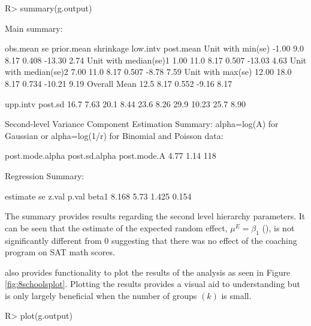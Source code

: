 \documentclass[article]{jss}
\begin{document}
\begin{CodeChunk}
\begin{CodeInput}
R> summary(g.output)
\end{CodeInput}
\begin{CodeOutput}
Main summary:

                      obs.mean   se prior.mean shrinkage low.intv post.mean
Unit with min(se)        -1.00  9.0       8.17     0.408   -13.30      2.74     
Unit with median(se)1     1.00 11.0       8.17     0.507   -13.03      4.63     
Unit with median(se)2     7.00 11.0       8.17     0.507    -8.78      7.59     
Unit with max(se)        12.00 18.0       8.17     0.734   -10.21      9.19     
Overall Mean                   12.5       8.17     0.552    -9.16      8.17     

                      upp.intv post.sd
                          16.7    7.63
                          20.1    8.44
                          23.6    8.26
                          29.9   10.23
                          25.7    8.90

Second-level Variance Component Estimation Summary:
alpha=log(A) for Gaussian or alpha=log(1/r) for Binomial and Poisson data:

post.mode.alpha post.sd.alpha post.mode.A
           4.77          1.14         118


Regression Summary:

      estimate   se z.val p.val
beta1    8.168 5.73 1.425 0.154
\end{CodeOutput}
\end{CodeChunk}
The summary provides results regarding the second level hierarchy parameters. It can be seen that the estimate of the expected random effect, $\mu^E=\beta_1$ (), is not significantly different from 0 suggesting that there was no effect of the coaching program on SAT math scores. 


 also provides functionality to plot the results of the analysis as seen in Figure \ref{fig:8schoolsplot}. Plotting the results provides a visual aid to understanding but is only largely beneficial when the number of groups $(k)$ is small. 

\begin{CodeChunk}
\begin{CodeInput}
R> plot(g.output)
\end{CodeInput}
\end{CodeChunk}
\end{document}
